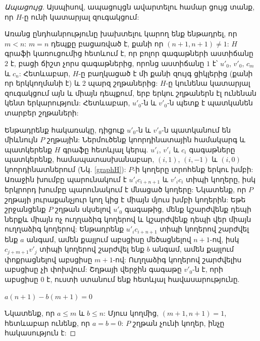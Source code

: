 \begin{proof}[Ապացույց]
Այսպիսով, ապացույցն ավարտելու համար ցույց տանք, որ $H$-ը ունի կատարյալ զուգակցում:

Առանց ընդհանրությունը խախտելու կարող ենք ենթադրել, որ $m<n$: $m=n$ դեպքը բացառված է, քանի որ $(n+1,n+1) \not= 1$: $H$ գրաֆի կառուցումից հետևում է, որ բոլոր գագաթների աստիճանը $2$ է, բացի ճիշտ չորս գագաթներից, որոնց աստիճանը $1$ է՝ $u'_0$, $v'_0$, $c_m$ և $c_n$: Հետևաբար, $H$-ը բաղկացած է մի քանի զույգ ցիկլերից (քանի որ երկկողմանի է) և 2 պարզ շղթաներից: $H$-ը կունենա կատարյալ զուգակցում այն և միայն դեպքում, երբ երկու շղթաներն էլ ունենան կենտ երկարություն: Հետևաբար, $u'_0$-ն և $v'_0$-ն պետք է պատկանեն տարբեր շղթաների:

Ենթադրենք հակառակը, դիցուք $u'_0$-ն և $v'_0$-ն պատկանում են միևնույն $P$ շղթային:
Ներմուծենք կոորդինատային համակարգ և պատկերենք $H$ գրաֆը հետևյալ կերպ.
$u'_i$, $v'_i$ և $c_i$ գագաթները պատկերենք, համապատասխանաբար, $(i, 1)$, $(i, -1)$ և
$(i, 0)$ կոորդինատներում (Նկ. \ref{graphH}): $P$-ի կողերը տրոհենք երկու խմբի: 
Առաջին խումբը պարունակում է $u'_ic_{i+n+1}$ և $v'_ic_i$ տիպի կողերը, իսկ երկրորդ խումբը պարունակում է մնացած կողերը: Նկատենք, որ $P$ շղթայի յուրաքանչյուր կող կից է միայն մյուս խմբի կողերին:
Եթե շրջանցենք $P$ շղթան սկսելով $u'_0$ գագաթից, մենք կշարժվենք դեպի ներքև միայն ոչ ուղղաձիգ կողերով և կշարժվենք դեպի վեր միայն ուղղաձիգ կողերով: Ենթադրենք 
$u'_ic_{i+n+1}$ տիպի կողերով շարժվել ենք $a$ անգամ, ամեն քայլում աբսցիսը մեծացնելով $n+1$-ով, իսկ
$c_{j+m+1}v'_j$ տիպի կողերով շարժվել ենք $b$ անգամ, ամեն քայլում փոքրացնելով աբսցիսը $m+1$-ով: Ուղղաձիգ կողերով շարժվելիս աբսցիսը չի փոխվում:
Շղթայի վերջին գագաթը $v'_0$-ն է, որի աբսցիսը $0$ է, ուստի ստանում ենք հետևյալ հավասարությունը.
\begin{center}
$a(n+1) - b(m+1) = 0$
\end{center}
Նկատենք, որ $a\leq m$ և $b \leq n$: Մյուս կողմից, $(m+1, n+1)=1$, հետևաբար ունենք, որ
$a=b=0$: $P$ շղթան չունի կողեր, ինչը հակասություն է:
\end{proof}

